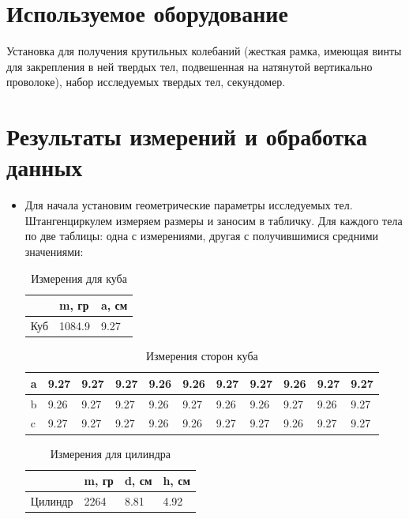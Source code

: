 \documentclass[a4paper, 10pt]{article}%
\begin{document}
\section{Используемое оборудование}

\quad Установка для получения крутильных колебаний (жесткая рамка, имеющая винты для закрепления в ней твердых тел, подвешенная на натянутой вертикально проволоке), набор исследуемых твердых тел, секундомер.

\section{Результаты измерений и обработка данных}

\begin{itemize}
    \item Для начала установим геометрические параметры исследуемых тел. 
Штангенциркулем измеряем размеры и заносим в табличку. Для каждого тела по две таблицы: одна с измерениями, другая с получившимися средними значениями:

\begin{table}[!h]
    \centering
    \begin{tabular}{|l|l|l|} \hline
          & m, гр & a, см \\ \hline
        Куб & 1084.9 & 9.27  \\ \hline
    \end{tabular}
    \caption{Измерения для куба}
\end{table}
\begin{table}[!h]
    \centering
    \begin{tabular}{|l|l|l||l|l|l||l|l|l||l||l|} \hline
        a & 9.27 & 9.27 & 9.27 & 9.26 & 9.26 & 9.27 & 9.27 & 9.26 & 9.27 & 9.27 \\ \hline
        b & 9.26 & 9.27 & 9.27 & 9.26 & 9.27 & 9.26 & 9.26 & 9.27 & 9.26 & 9.27 \\ \hline
        c & 9.27 & 9.27 & 9.27 & 9.26 & 9.26 & 9.27 & 9.27 & 9.26 & 9.27 & 9.27 \\ \hline
    \end{tabular}
    \caption{Измерения сторон куба}
\end{table}

\begin{table}[!h]
    \centering
    \begin{tabular}{|l|l|l|l|} \hline
         & m, гр & d, см & h, см  \\ \hline
        Цилиндр & 2264 & 8.81 & 4.92  \\ \hline
    \end{tabular}
    \caption{Измерения для цилиндра}
\end{table}


\end{itemize}
\end{document}
